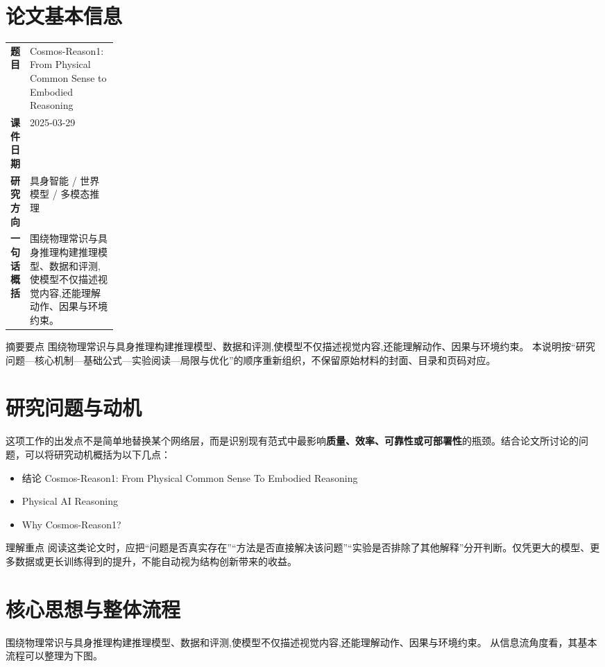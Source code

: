\documentclass[UTF8,11pt,a4paper]{ctexart}
\newcommand{\term}[1]{\textbf{\textcolor{mainblue}{#1}}}
\begin{document}
\section{论文基本信息}
\begin{center}
\begin{tabularx}{0.94\linewidth}{>{\bfseries}p{0.18\linewidth}X}
\toprule
题目 & Cosmos-Reason1: From Physical Common Sense to Embodied Reasoning\\
课件日期 & 2025-03-29\\
研究方向 & 具身智能 / 世界模型 / 多模态推理\\
一句话概括 & 围绕物理常识与具身推理构建推理模型、数据和评测,使模型不仅描述视觉内容,还能理解动作、因果与环境约束。\\
\bottomrule
\end{tabularx}
\end{center}

\begin{infobox}{摘要要点}
围绕物理常识与具身推理构建推理模型、数据和评测,使模型不仅描述视觉内容,还能理解动作、因果与环境约束。 本说明按“研究问题—核心机制—基础公式—实验阅读—局限与优化”的顺序重新组织，不保留原始材料的封面、目录和页码对应。
\end{infobox}

\section{研究问题与动机}
这项工作的出发点不是简单地替换某个网络层，而是识别现有范式中最影响\term{质量、效率、可靠性或可部署性}的瓶颈。结合论文所讨论的问题，可以将研究动机概括为以下几点：
\begin{itemize}
\item 结论 Cosmos-Reason1: From Physical Common Sense To Embodied Reasoning
\item Physical AI Reasoning
\item Why Cosmos-Reason1?
\end{itemize}

\begin{notebox}{理解重点}
阅读这类论文时，应把“问题是否真实存在”“方法是否直接解决该问题”“实验是否排除了其他解释”分开判断。仅凭更大的模型、更多数据或更长训练得到的提升，不能自动视为结构创新带来的收益。
\end{notebox}

\section{核心思想与整体流程}
围绕物理常识与具身推理构建推理模型、数据和评测,使模型不仅描述视觉内容,还能理解动作、因果与环境约束。 从信息流角度看，其基本流程可以整理为下图。
\end{document}
